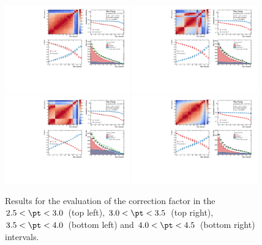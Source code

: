 \begin{figure}
    \centering
    \includegraphics[width=0.48\textwidth]{Figures/Chapter 6/AllPropmtFracs/Dplus/DplusPromptFrac25_30.pdf}
    \includegraphics[width=0.48\textwidth]{Figures/Chapter 6/AllPropmtFracs/Dplus/DplusPromptFrac30_35.pdf}
    \includegraphics[width=0.48\textwidth]{Figures/Chapter 6/AllPropmtFracs/Dplus/DplusPromptFrac35_40.pdf}
    \includegraphics[width=0.48\textwidth]{Figures/Chapter 6/AllPropmtFracs/Dplus/DplusPromptFrac40_45.pdf}
    \caption{Results for the evaluation of the \fpdpl correction factor in the $2.5 < \pt < 3.0$~\gevc (top left), $3.0 < \pt < 3.5$~\gevc (top right), $3.5 < \pt < 4.0$~\gevc (bottom left) and $4.0 < \pt < 4.5$~\gevc (bottom right) intervals.}
\end{figure}

